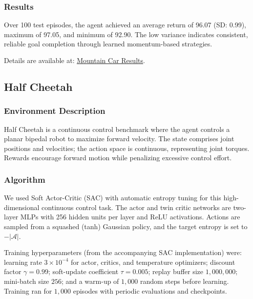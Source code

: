 \documentclass[10pt]{article}
\begin{document}
\subsubsection{Results}

Over 100 test episodes, the agent achieved an average return of 96.07 (SD: 0.99), maximum of 97.05, and minimum of 92.90. The low variance indicates consistent, reliable goal completion through learned momentum-based strategies.

Details are available at:
\href{https://sites.google.com/view/rewardrush-teampiratesofthegym/results/mountain-car?authuser=0}{Mountain Car Results}.

\subsection{Half Cheetah}

\vspace{1em}

\subsubsection{Environment Description}
Half Cheetah is a continuous control benchmark where the agent controls a planar bipedal robot to maximize forward velocity. The state comprises joint positions and velocities; the action space is continuous, representing joint torques. Rewards encourage forward motion while penalizing excessive control effort.

\subsubsection{Algorithm}
We used Soft Actor-Critic (SAC) with automatic entropy tuning for this high-dimensional continuous control task. The actor and twin critic networks are two-layer MLPs with 256 hidden units per layer and ReLU activations. Actions are sampled from a squashed (tanh) Gaussian policy, and the target entropy is set to $-\lvert\mathcal{A}\rvert$.

Training hyperparameters (from the accompanying SAC implementation) were: learning rate $3\times 10^{-4}$ for actor, critics, and temperature optimizers; discount factor $\gamma = 0.99$; soft-update coefficient $\tau = 0.005$; replay buffer size $1{,}000{,}000$; mini-batch size $256$; and a warm-up of $1{,}000$ random steps before learning. Training ran for $1{,}000$ episodes with periodic evaluations and checkpoints.
\end{document}

